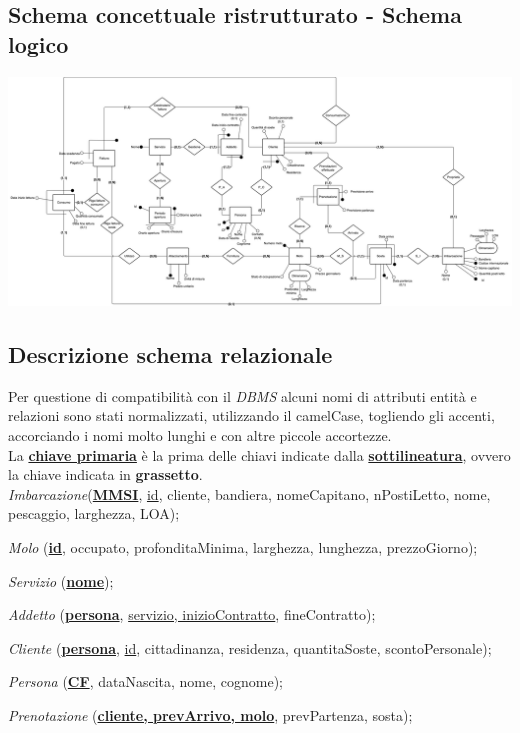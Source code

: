 \subsection{Schema concettuale ristrutturato - Schema logico}
\includegraphics[width=\textwidth]{img/erlogico.png}


\subsection{Descrizione schema relazionale}

Per questione di compatibilità con il \textit{DBMS} alcuni nomi di attributi entità e relazioni sono stati normalizzati, utilizzando il camelCase, togliendo gli accenti, accorciando i nomi molto lunghi e con altre piccole accortezze.\\

La \underline{\textbf{chiave primaria}} è la prima delle chiavi indicate dalla \underline{\textbf{sottilineatura}}, ovvero la chiave indicata in \textbf{grassetto}.\\

\textit{Imbarcazione}(\underline{\textbf{MMSI}}, \underline{id}, cliente, bandiera, nomeCapitano, nPostiLetto, nome, pescaggio, larghezza, LOA);

\textit{Molo} (\underline{\textbf{id}}, occupato, profonditaMinima, larghezza, lunghezza, prezzoGiorno);

\textit{Servizio} (\underline{\textbf{nome}});

\textit{Addetto} (\underline{\textbf{persona}}, \underline{servizio, inizioContratto}, fineContratto);

\textit{Cliente} (\underline{\textbf{persona}}, \underline{id}, cittadinanza, residenza, quantitaSoste, scontoPersonale);

\textit{Persona} (\underline{\textbf{CF}}, dataNascita, nome, cognome);

\textit{Prenotazione} (\underline{\textbf{cliente, prevArrivo, molo}}, prevPartenza, sosta);

